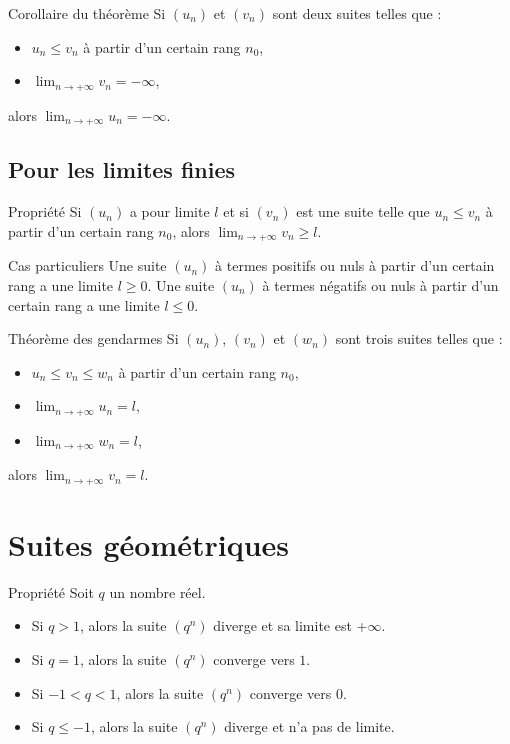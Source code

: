 \documentclass[11pt,a4paper]{article}
\begin{document}
\begin{boiteProp}{Corollaire du théorème}
    Si $(u_n)$ et $(v_n)$ sont deux suites telles que :
    \begin{itemize}
        \item $u_n \leq v_n$ à partir d'un certain rang $n_0$,
        \item $\displaystyle \lim_{n \to +\infty} v_n = -\infty$,
    \end{itemize}
    alors $\displaystyle \lim_{n \to +\infty} u_n = -\infty$.
\end{boiteProp}

\subsection{Pour les limites finies}

\begin{boiteProp}{Propriété}
    Si $(u_n)$ a pour limite $l$ et si $(v_n)$ est une suite telle que $u_n \leq v_n$ à partir d'un certain rang $n_0$, alors $\displaystyle \lim_{n \to +\infty} v_n \geq l$.
\end{boiteProp}

\begin{boiteProp}{Cas particuliers}
    Une suite $(u_n)$ à termes positifs ou nuls à partir d'un certain rang a une limite $l \geq 0$.
    \newline
    Une suite $(u_n)$ à termes négatifs ou nuls à partir d'un certain rang a une limite $l \leq 0$.
\end{boiteProp}

\begin{boiteProp}{Théorème des gendarmes}
    Si $(u_n)$, $(v_n)$ et $(w_n)$ sont trois suites telles que :
    \begin{itemize}
        \item $u_n \leq v_n \leq w_n$ à partir d'un certain rang $n_0$,
        \item $\displaystyle \lim_{n \to +\infty} u_n = l$,
        \item $\displaystyle \lim_{n \to +\infty} w_n = l$,
    \end{itemize}
    alors $\displaystyle \lim_{n \to +\infty} v_n = l$.
\end{boiteProp}

\section{Suites géométriques}

\begin{boiteProp}{Propriété}
    Soit $q$ un nombre réel.
    \begin{itemize}
        \item Si $q > 1$, alors la suite $(q^n)$ diverge et sa limite est +$\infty$.
        \item Si $q = 1$, alors la suite $(q^n)$ converge vers $1$.
        \item Si $-1 < q < 1$, alors la suite $(q^n)$ converge vers $0$.
        \item Si $q \leq -1$, alors la suite $(q^n)$ diverge et n'a pas de limite.
    \end{itemize}
\end{boiteProp}
\end{document}
